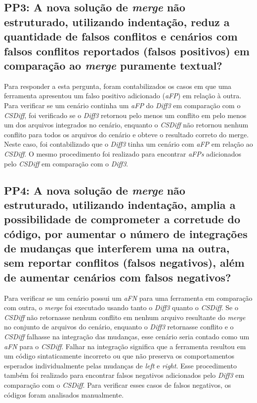 \subsection{PP3: A nova solução de \emph{merge} não estruturado, utilizando
	indentação, reduz a quantidade de falsos conflitos e cenários com falsos
	conflitos reportados (falsos positivos) em comparação ao \emph{merge} puramente
	textual?}

Para responder a esta pergunta, foram contabilizados os casos em que uma
ferramenta apresentou um falso positivo adicionado (\emph{aFP}) em relação à
outra. Para verificar se um cenário continha um \emph{aFP} do \emph{Diff3} em
comparação com o \emph{CSDiff}, foi verificado se o \emph{Diff3} retornou pelo
menos um conflito em pelo menos um dos arquivos integrados no cenário, enquanto
o \emph{CSDiff} não retornou nenhum conflito para todos os arquivos do cenário
e obteve o resultado correto do merge. Neste caso, foi contabilizado que o
\emph{Diff3} tinha um cenário com \emph{aFP} em relação ao \emph{CSDiff}. O
mesmo procedimento foi realizado para encontrar \emph{aFPs} adicionados pelo
\emph{CSDiff} em comparação com o \emph{Diff3}.

\subsection{PP4: A nova solução de \emph{merge} não estruturado, utilizando
	indentação, amplia a possibilidade de comprometer a corretude do código,
	por aumentar o número de integrações de mudanças que interferem uma na
	outra, sem reportar conflitos (falsos negativos), além de aumentar cenários
	com falsos negativos?}

Para verificar se um cenário possui um \emph{aFN} para uma ferramenta em
comparação com outra, o \emph{merge} foi executado usando tanto o \emph{Diff3}
quanto o \emph{CSDiff}. Se o \emph{CSDiff} não retornasse nenhum conflito em
nenhum arquivo resultante do \emph{merge} no conjunto de arquivos do cenário,
enquanto o \emph{Diff3} retornasse conflito e o \emph{CSDiff} falhasse na
integração das mudanças, esse cenário seria contado como um \emph{aFN} para o
\emph{CSDiff}. Falhar na integração significa que a ferramenta resultou em um
código sintaticamente incorreto ou que não preserva os comportamentos esperados
individualmente pelas mudanças de \emph{left} e \emph{right}. Esse procedimento
também foi realizado para encontrar falsos negativos adicionados pelo
\emph{Diff3} em comparação com o \emph{CSDiff}. Para verificar esses casos de
falsos negativos, os códigos foram analisados manualmente.

